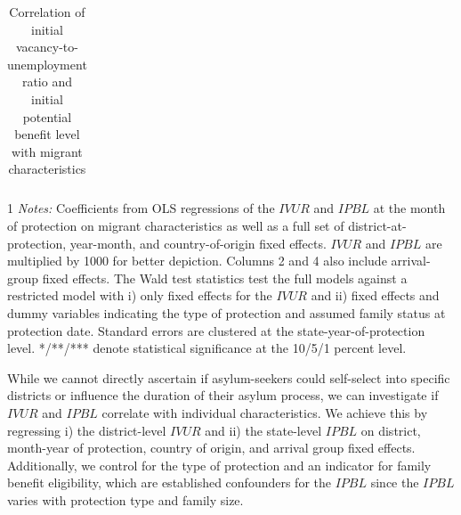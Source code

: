 


\begin{table}
	\caption{Correlation of initial vacancy-to-unemployment ratio and initial potential benefit level with migrant characteristics}
	\label{tab:ivur_ipbl_balance}
 \centering
	\begin{threeparttable}
		\begin{small}
   \centering
			\begin{tabular}{lcccc}				
   
			\end{tabular}
		\end{small}
		\begin{tablenotes} 
			\begin{footnotesize}
				\begin{spacing}{1}
					\textit{Notes:} Coefficients from OLS regressions of the $IVUR$ and $IPBL$ at the month of protection on migrant characteristics as well as a full set of district-at-protection, year-month, and country-of-origin fixed effects. $IVUR$ and $IPBL$ are multiplied by 1000 for better depiction. Columns 2 and 4 also include arrival-group fixed effects. The Wald test statistics test the full models against a restricted model with i) only fixed effects for the $IVUR$ and ii) fixed effects and dummy variables indicating the type of protection and assumed family status at protection date. Standard errors are clustered at the state-year-of-protection level. */**/*** denote statistical significance at the 10/5/1 percent level.
				\end{spacing}
			\end{footnotesize}
		\end{tablenotes}
	\end{threeparttable}
\end{table}

While we cannot directly ascertain if asylum-seekers could self-select into specific districts or influence the duration of their asylum process, we can investigate if $IVUR$ and $IPBL$ correlate with individual characteristics.
We achieve this by regressing i) the district-level $IVUR$ and ii) the state-level $IPBL$ on district, month-year of protection, country of origin, and arrival group fixed effects. Additionally, we control for the type of protection and an indicator for family benefit eligibility, which are established confounders for the $IPBL$ since the $IPBL$ varies with protection type and family size.

